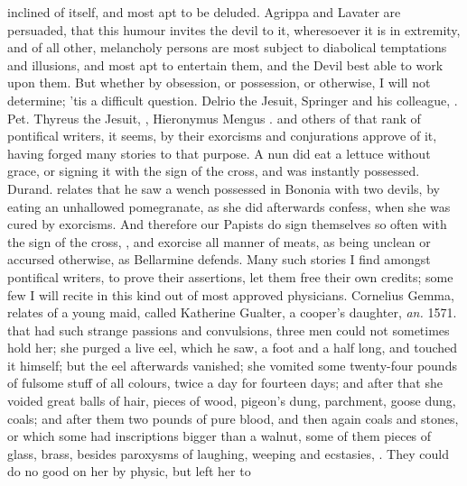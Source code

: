 inclined of itself, and most apt to be deluded. Agrippa
and Lavater are persuaded, that this humour invites the
devil to it, wheresoever it is in extremity, and of all other, melancholy
persons are most subject to diabolical temptations and illusions, and most apt
to entertain them, and the Devil best able to work upon them. But whether by
obsession, or possession, or otherwise, I will not determine; 'tis a difficult
question. Delrio the Jesuit,  Springer
and his colleague, . Pet. Thyreus the Jesuit,
, Hieronymus Mengus . and others of that rank of pontifical writers, it seems, by their
exorcisms and conjurations approve of it, having forged many stories to that
purpose. A nun did eat a lettuce without grace, or signing
it with the sign of the cross, and was instantly possessed. Durand.
 relates that he saw a
wench possessed in Bononia with two devils, by eating an unhallowed
pomegranate, as she did afterwards confess, when she was cured by exorcisms.
And therefore our Papists do sign themselves so often with the sign of the
cross, , and exorcise all manner of meats, as being
unclean or accursed otherwise, as Bellarmine defends. Many such stories I find
amongst pontifical writers, to prove their assertions, let them free their own
credits; some few I will recite in this kind out of most approved physicians.
Cornelius Gemma,  relates of
a young maid, called Katherine Gualter, a cooper's daughter, \emph{an.} 1571.
that had such strange passions and convulsions, three men could not sometimes
hold her; she purged a live eel, which he saw, a foot and a half long, and
touched it himself; but the eel afterwards vanished; she vomited some
twenty-four pounds of fulsome stuff of all colours, twice a day for fourteen
days; and after that she voided great balls of hair, pieces of wood, pigeon's
dung, parchment, goose dung, coals; and after them two pounds of pure blood,
and then again coals and stones, or which some had inscriptions bigger than a
walnut, some of them pieces of glass, brass, \etc{} besides paroxysms of
laughing, weeping and ecstasies, \etc{} . They could do no good on her by physic, but left her to
